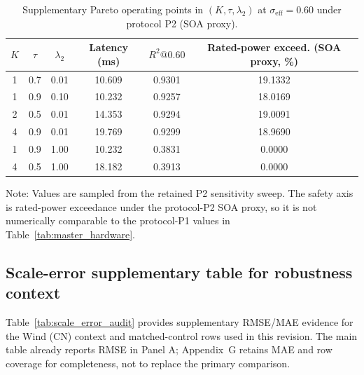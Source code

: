 \documentclass[review,1p,times]{elsarticle}
\newcommand{\aeTableNote}[1]{%
  \par\vspace{2pt}%
  \noindent\begin{minipage}{\linewidth}
    \raggedright\footnotesize
    Note: #1
  \end{minipage}%
  \par
}
\begin{document}
\begin{table}[t]
\centering
\caption{Supplementary Pareto operating points in $(K,\tau,\lambda_2)$ at $\sigma_{\mathrm{eff}}=0.60$ under protocol P2 (SOA proxy).}
\label{tab:table6_joint_pareto}
\label{tab:joint_parameter_analysis}
\label{tab:joint_nkt_full_summary}
\footnotesize
\setlength{\tabcolsep}{4pt}
\begin{tabular*}{0.86\linewidth}{@{\extracolsep{\fill}}cccccc@{}}
\toprule
\textbf{$K$} & \textbf{$\tau$} & \textbf{$\lambda_2$} & \textbf{Latency (ms)} & \textbf{$R^2@0.60$} & \textbf{Rated-power exceed. (SOA proxy, \%)} \\
\midrule
1 & 0.7 & 0.01 & 10.609 & 0.9301 & 19.1332 \\
1 & 0.9 & 0.10 & 10.232 & 0.9257 & 18.0169 \\
2 & 0.5 & 0.01 & 14.353 & 0.9294 & 19.0091 \\
4 & 0.9 & 0.01 & 19.769 & 0.9299 & 18.9690 \\
1 & 0.9 & 1.00 & 10.232 & 0.3831 & 0.0000 \\
4 & 0.5 & 1.00 & 18.182 & 0.3913 & 0.0000 \\
\bottomrule
\end{tabular*}
\aeTableNote{Values are sampled from the retained P2 sensitivity sweep. The safety axis is rated-power exceedance under the protocol-P2 SOA proxy, so it is not numerically comparable to the protocol-P1 values in Table~\ref{tab:master_hardware}.}
\end{table}

\subsection{Scale-error supplementary table for robustness context}
\label{subsec:scale_error_audit}
Table~\ref{tab:scale_error_audit} provides supplementary RMSE/MAE evidence for the Wind (CN) context and matched-control rows used in this revision. The main table already reports RMSE in Panel A; Appendix~G retains MAE and row coverage for completeness, not to replace the primary comparison.
\end{document}
